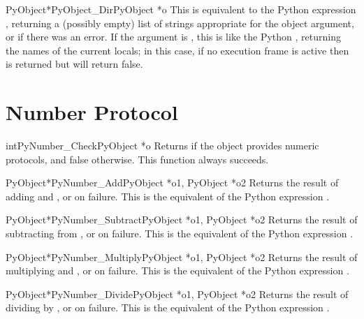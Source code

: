 \begin{cfuncdesc}{PyObject*}{PyObject_Dir}{PyObject *o}
  This is equivalent to the Python expression ,
  returning a (possibly empty) list of strings appropriate for the
  object argument, or \NULL{} if there was an error.  If the argument
  is \NULL, this is like the Python , returning the names
  of the current locals; in this case, if no execution frame is active
  then \NULL{} is returned but  will
  return false.
\end{cfuncdesc}


\section{Number Protocol \label{number}}

\begin{cfuncdesc}{int}{PyNumber_Check}{PyObject *o}
  Returns  if the object  provides numeric protocols,
  and false otherwise.  This function always succeeds.
\end{cfuncdesc}


\begin{cfuncdesc}{PyObject*}{PyNumber_Add}{PyObject *o1, PyObject *o2}
  Returns the result of adding  and , or \NULL{} on
  failure.  This is the equivalent of the Python expression
  .
\end{cfuncdesc}


\begin{cfuncdesc}{PyObject*}{PyNumber_Subtract}{PyObject *o1, PyObject *o2}
  Returns the result of subtracting  from , or \NULL{}
  on failure.  This is the equivalent of the Python expression
  .
\end{cfuncdesc}


\begin{cfuncdesc}{PyObject*}{PyNumber_Multiply}{PyObject *o1, PyObject *o2}
  Returns the result of multiplying  and , or \NULL{}
  on failure.  This is the equivalent of the Python expression
  .
\end{cfuncdesc}


\begin{cfuncdesc}{PyObject*}{PyNumber_Divide}{PyObject *o1, PyObject *o2}
  Returns the result of dividing  by , or \NULL{} on
  failure.  This is the equivalent of the Python expression
  .
\end{cfuncdesc}


